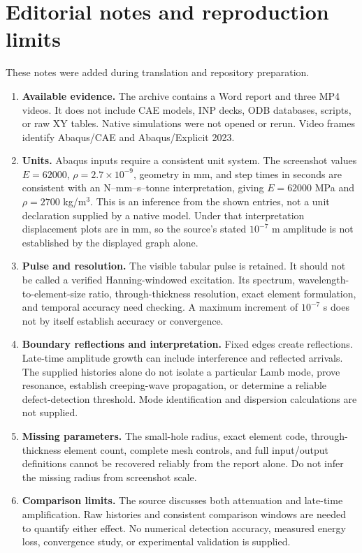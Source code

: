 \documentclass[11pt,a4paper]{article}
\begin{document}
\section{Editorial notes and reproduction limits}
These notes were added during translation and repository preparation.
\begin{enumerate}
\item \textbf{Available evidence.} The archive contains a Word report and three MP4 videos. It does not include CAE models, INP decks, ODB databases, scripts, or raw XY tables. Native simulations were not opened or rerun. Video frames identify Abaqus/CAE and Abaqus/Explicit 2023.
\item \textbf{Units.} Abaqus inputs require a consistent unit system. The screenshot values $E=62000$, $\rho=2.7\times10^{-9}$, geometry in mm, and step times in seconds are consistent with an N--mm--s--tonne interpretation, giving $E=62000$ MPa and $\rho=2700$ kg/m$^3$. This is an inference from the shown entries, not a unit declaration supplied by a native model. Under that interpretation displacement plots are in mm, so the source's stated $10^{-7}$ m amplitude is not established by the displayed graph alone.
\item \textbf{Pulse and resolution.} The visible tabular pulse is retained. It should not be called a verified Hanning-windowed excitation. Its spectrum, wavelength-to-element-size ratio, through-thickness resolution, exact element formulation, and temporal accuracy need checking. A maximum increment of $10^{-7}$ s does not by itself establish accuracy or convergence.
\item \textbf{Boundary reflections and interpretation.} Fixed edges create reflections. Late-time amplitude growth can include interference and reflected arrivals. The supplied histories alone do not isolate a particular Lamb mode, prove resonance, establish creeping-wave propagation, or determine a reliable defect-detection threshold. Mode identification and dispersion calculations are not supplied.
\item \textbf{Missing parameters.} The small-hole radius, exact element code, through-thickness element count, complete mesh controls, and full input/output definitions cannot be recovered reliably from the report alone. Do not infer the missing radius from screenshot scale.
\item \textbf{Comparison limits.} The source discusses both attenuation and late-time amplification. Raw histories and consistent comparison windows are needed to quantify either effect. No numerical detection accuracy, measured energy loss, convergence study, or experimental validation is supplied.

\end{enumerate}
\end{document}
